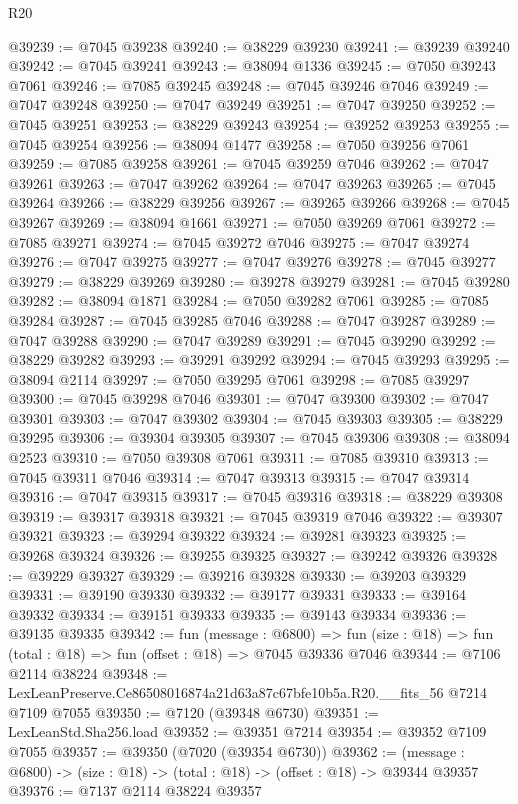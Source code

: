 \begin{lexlean}{R20}
\begin{coremodule}
{@39239 := @7045 @39238
@39240 := @38229 @39230
@39241 := @39239 @39240
@39242 := @7045 @39241
@39243 := @38094 @1336
@39245 := @7050 @39243 @7061
@39246 := @7085 @39245
@39248 := @7045 @39246 @7046
@39249 := @7047 @39248
@39250 := @7047 @39249
@39251 := @7047 @39250
@39252 := @7045 @39251
@39253 := @38229 @39243
@39254 := @39252 @39253
@39255 := @7045 @39254
@39256 := @38094 @1477
@39258 := @7050 @39256 @7061
@39259 := @7085 @39258
@39261 := @7045 @39259 @7046
@39262 := @7047 @39261
@39263 := @7047 @39262
@39264 := @7047 @39263
@39265 := @7045 @39264
@39266 := @38229 @39256
@39267 := @39265 @39266
@39268 := @7045 @39267
@39269 := @38094 @1661
@39271 := @7050 @39269 @7061
@39272 := @7085 @39271
@39274 := @7045 @39272 @7046
@39275 := @7047 @39274
@39276 := @7047 @39275
@39277 := @7047 @39276
@39278 := @7045 @39277
@39279 := @38229 @39269
@39280 := @39278 @39279
@39281 := @7045 @39280
@39282 := @38094 @1871
@39284 := @7050 @39282 @7061
@39285 := @7085 @39284
@39287 := @7045 @39285 @7046
@39288 := @7047 @39287
@39289 := @7047 @39288
@39290 := @7047 @39289
@39291 := @7045 @39290
@39292 := @38229 @39282
@39293 := @39291 @39292
@39294 := @7045 @39293
@39295 := @38094 @2114
@39297 := @7050 @39295 @7061
@39298 := @7085 @39297
@39300 := @7045 @39298 @7046
@39301 := @7047 @39300
@39302 := @7047 @39301
@39303 := @7047 @39302
@39304 := @7045 @39303
@39305 := @38229 @39295
@39306 := @39304 @39305
@39307 := @7045 @39306
@39308 := @38094 @2523
@39310 := @7050 @39308 @7061
@39311 := @7085 @39310
@39313 := @7045 @39311 @7046
@39314 := @7047 @39313
@39315 := @7047 @39314
@39316 := @7047 @39315
@39317 := @7045 @39316
@39318 := @38229 @39308
@39319 := @39317 @39318
@39321 := @7045 @39319 @7046
@39322 := @39307 @39321
@39323 := @39294 @39322
@39324 := @39281 @39323
@39325 := @39268 @39324
@39326 := @39255 @39325
@39327 := @39242 @39326
@39328 := @39229 @39327
@39329 := @39216 @39328
@39330 := @39203 @39329
@39331 := @39190 @39330
@39332 := @39177 @39331
@39333 := @39164 @39332
@39334 := @39151 @39333
@39335 := @39143 @39334
@39336 := @39135 @39335
@39342 := fun (message : @6800) =>
  fun (size : @18) => fun (total : @18) => fun (offset : @18) => @7045 @39336 @7046
@39344 := @7106 @2114 @38224
@39348 := LexLeanPreserve.Ce86508016874a21d63a87c67bfe10b5a.R20.__fits_56 @7214 @7109 @7055
@39350 := @7120 (@39348 @6730)
@39351 := LexLeanStd.Sha256.load
@39352 := @39351 @7214
@39354 := @39352 @7109 @7055
@39357 := @39350 (@7020 (@39354 @6730))
@39362 := (message : @6800) -> (size : @18) -> (total : @18) -> (offset : @18) -> @39344 @39357
@39376 := @7137
    @2114
    @38224
    @39357
}
\end{coremodule}
\end{lexlean}
